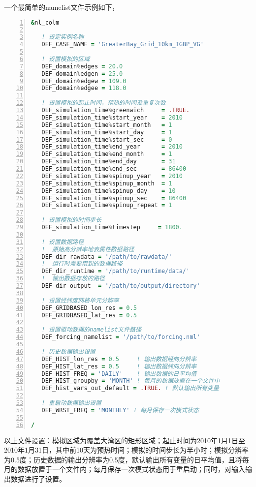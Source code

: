 \documentclass[a4paper,12pt,twoside]{article}
\begin{document}
一个最简单的namelist文件示例如下，
\begin{lstlisting}[language=fortran, basicstyle=\linespread{1.2}\footnotesize\ttfamily, commentstyle=\color{olive}, numbers=left, numberstyle=\tiny, xleftmargin=1.5em,xrightmargin=0em, aboveskip=1em]
&nl_colm

   ! 设定实例名称
   DEF_CASE_NAME = 'GreaterBay_Grid_10km_IGBP_VG'

   ! 设置模拟的区域
   DEF_domain%edges = 20.0
   DEF_domain%edgen = 25.0
   DEF_domain%edgew = 109.0
   DEF_domain%edgee = 118.0

   ! 设置模拟的起止时间，预热的时间及重复次数
   DEF_simulation_time%greenwich     = .TRUE.
   DEF_simulation_time%start_year    = 2010
   DEF_simulation_time%start_month   = 1
   DEF_simulation_time%start_day     = 1
   DEF_simulation_time%start_sec     = 0
   DEF_simulation_time%end_year      = 2010
   DEF_simulation_time%end_month     = 1
   DEF_simulation_time%end_day       = 31
   DEF_simulation_time%end_sec       = 86400
   DEF_simulation_time%spinup_year   = 2010
   DEF_simulation_time%spinup_month  = 1
   DEF_simulation_time%spinup_day    = 10
   DEF_simulation_time%spinup_sec    = 86400
   DEF_simulation_time%spinup_repeat = 1

   ! 设置模拟的时间步长
   DEF_simulation_time%timestep     = 1800.

   ! 设置数据路径
   !  原始高分辨率地表属性数据路径
   DEF_dir_rawdata = '/path/to/rawdata/'   
   !  运行时需要用到的数据路径
   DEF_dir_runtime = '/path/to/runtime/data/'   
   !  输出数据存放的路径
   DEF_dir_output  = '/path/to/output/directory'  

   ! 设置经纬度网格单元分辨率
   DEF_GRIDBASED_lon_res = 0.5
   DEF_GRIDBASED_lat_res = 0.5

   ! 设置驱动数据的namelist文件路径
   DEF_forcing_namelist = '/path/to/forcing.nml'

   ! 历史数据输出设置
   DEF_HIST_lon_res = 0.5     ! 输出数据经向分辨率
   DEF_HIST_lat_res = 0.5     ! 输出数据纬向分辨率
   DEF_HIST_FREQ = 'DAILY'    ! 输出数据的日平均值
   DEF_HIST_groupby = 'MONTH' ! 每月的数据放置在一个文件中
   DEF_hist_vars_out_default = .TRUE. ! 默认输出所有变量

   ! 重启动数据输出设置
   DEF_WRST_FREQ = 'MONTHLY' ! 每月保存一次模式状态

/
\end{lstlisting}

以上文件设置：模拟区域为覆盖大湾区的矩形区域；起止时间为2010年1月1日至2010年1月31日，其中前10天为预热时间；模拟的时间步长为半小时；模拟分辨率为0.5度；历史数据的输出分辨率为0.5度，默认输出所有变量的日平均值，且将每月的数据放置于一个文件内；每月保存一次模式状态用于重启动；同时，对输入输出数据进行了设置。
\end{document}
